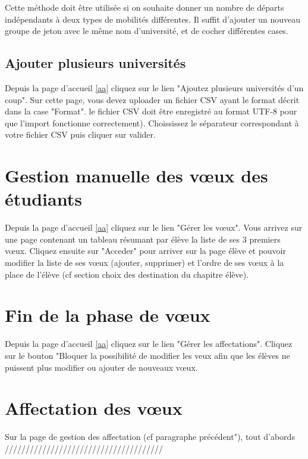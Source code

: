 \smallbreak

Cette méthode doit être utilisée si on souhaite donner un nombre de départs indépendants à deux types de mobilités différentes. Il suffit d'ajouter un nouveau groupe de jeton avec le même nom d'université, et de cocher différentes cases.


\subsection{Ajouter plusieurs universités} 
\label{au}

Depuis la page d'accueil \ref{aa} cliquez sur le lien "Ajoutez plusieurs universités d'un coup". Sur cette page, vous devez uploader un fichier CSV ayant le format décrit dans la case "Format". \att le fichier CSV doit être enregistré au format UTF-8 pour que l'import fonctionne correctement). Choississez le séparateur correspondant à votre fichier CSV puis cliquer sur valider.

\section{Gestion manuelle des vœux des étudiants}

Depuis la page d'accueil \ref{aa} cliquez sur le lien "Gérer les vœux". Vous arrivez sur une page contenant un tableau résumant par élève la liste de ses 3 premiers vœux. Cliquez ensuite sur "Acceder" pour arriver sur la page élève et pouvoir modifier la liste de ses vœux (ajouter, supprimer) et l'ordre de ses vœux à la place de l'élève (cf section choix des destination du chapitre élève).

\section{Fin de la phase de vœux} 

Depuis la page d'accueil \ref{aa} cliquez sur le lien "Gérer les affectations". Cliquez sur le bouton "Bloquer la possibilité de modifier les veux afin que les élèves ne puissent plus modifier ou ajouter de nouveaux vœux.

\section{Affectation des vœux}
\label{afv}

Sur la page de gestion des affectation (cf paragraphe précédent"), tout d'abords //////////////////////////////////////

